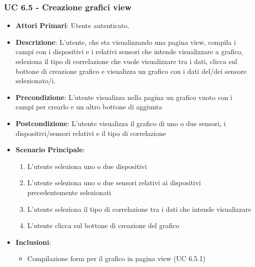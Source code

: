 			\subsubsection{UC 6.5 - Creazione grafici view}
			\begin{itemize}
				\item \textbf{Attori Primari}: Utente autenticato.
				\item \textbf{Descrizione}: L'utente, che sta visualizzando una pagina view, compila i campi con i dispositivi e i relativi sensori che intende visualizzare a grafico, seleziona il tipo di correlazione che vuole visualizzare tra i dati, clicca sul bottone di creazione grafico e visualizza un grafico con i dati del/dei sensore selezionato/i.
				\item \textbf{Precondizione}: L'utente visualizza nella pagina un grafico vuoto con i campi per crearlo e un altro bottone di aggiunta
				\item \textbf{Postcondizione}: L'utente visualizza il grafico di uno o due sensori, i dispositivi/sensori relativi e il tipo di correlazione 
				\item \textbf{Scenario Principale}:
				\begin{enumerate}
					\item{L'utente seleziona uno o due dispositivi}
					\item{L'utente seleziona uno o due sensori relativi ai dispositivi precedentemente selezionati}
					\item{L'utente seleziona il tipo di correlazione tra i dati che intende visualizzare}
					\item{L'utente clicca sul bottone di creazione del grafico}
				\end{enumerate}	
				\item \textbf{Inclusioni}:
				\begin{itemize}
					\item Compilazione form per il grafico in pagina view (UC 6.5.1)
				\end{itemize}
			\end{itemize}

